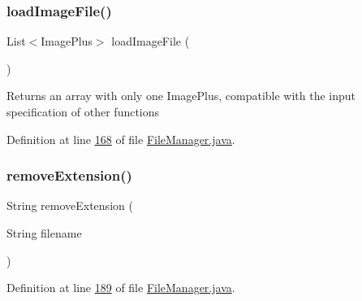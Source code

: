 \hypertarget{classfunctions_1_1_file_manager_a10f7f3b24be48586ca7455ebac6abcd7}{}\label{classfunctions_1_1_file_manager_a10f7f3b24be48586ca7455ebac6abcd7} 
\subsubsection{\texorpdfstring{load\+Image\+File()}{loadImageFile()}}
{\footnotesize\ttfamily List$<$Image\+Plus$>$ load\+Image\+File (\begin{DoxyParamCaption}{ }\end{DoxyParamCaption})}

\begin{DoxyReturn}{Returns}
an array with only one Image\+Plus, compatible with the input specification of other functions 
\end{DoxyReturn}


Definition at line \hyperlink{_file_manager_8java_source_l00168}{168} of file \hyperlink{_file_manager_8java_source}{File\+Manager.\+java}.

\hypertarget{classfunctions_1_1_file_manager_a4053142396d8fa1e3d2a2c1974952124}{}\label{classfunctions_1_1_file_manager_a4053142396d8fa1e3d2a2c1974952124} 
\subsubsection{\texorpdfstring{remove\+Extension()}{removeExtension()}}
{\footnotesize\ttfamily String remove\+Extension (\begin{DoxyParamCaption}\item[{String}]{filename }\end{DoxyParamCaption})}



Definition at line \hyperlink{_file_manager_8java_source_l00189}{189} of file \hyperlink{_file_manager_8java_source}{File\+Manager.\+java}.

\hypertarget{classfunctions_1_1_file_manager_aa741a9e7ac4127ae1a463fb626474edf}{}\label{classfunctions_1_1_file_manager_aa741a9e7ac4127ae1a463fb626474edf} 
